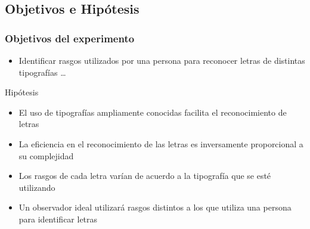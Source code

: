\documentclass{beamer}
\begin{document}
  \subsection{Objetivos e Hip\'otesis}
      \begin{frame}
	\frametitle{Objetivos del experimento}
	\begin{itemize}
		\item Identificar rasgos utilizados por una persona para reconocer letras de distintas tipograf\'ias  \ldots 
      \end{itemize}

      \begin{block}{Hip\'otesis}
      \begin{itemize}
		\item El uso de tipograf\'ias ampliamente conocidas facilita el reconocimiento de letras 
		\item La eficiencia en el reconocimiento de las letras es inversamente proporcional a su complejidad 
		\item Los rasgos de cada letra var\'ian de acuerdo a la tipograf\'ia que se est\'e utilizando 
		\item Un observador ideal utilizar\'a rasgos distintos a los que utiliza una persona para identificar letras	
	  \end{itemize}
      \end{block}

      \end{frame}
\end{document}
